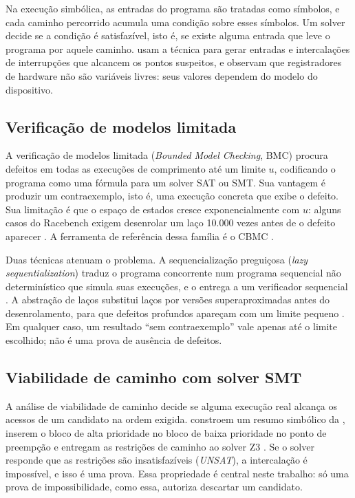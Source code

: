 Na execução simbólica, as entradas do programa são tratadas como símbolos, e
cada caminho percorrido acumula uma condição sobre esses símbolos. Um solver
decide se a condição é satisfazível, isto é, se existe alguma entrada que leve
o programa por aquele caminho.  usam a técnica para gerar
entradas e intercalações de interrupções que alcancem os pontos suspeitos, e
observam que registradores de hardware não são variáveis livres: seus valores
dependem do modelo do dispositivo.

\subsection{Verificação de modelos limitada}

A verificação de modelos limitada (\textit{Bounded Model Checking}, BMC)
procura defeitos em todas as execuções de comprimento até um limite $u$,
codificando o programa como uma fórmula para um solver SAT ou SMT. Sua
vantagem é produzir um contraexemplo, isto é, uma execução concreta que
exibe o defeito. Sua limitação é que o espaço de estados cresce
exponencialmente com $u$: alguns casos do Racebench exigem desenrolar um laço
10.000 vezes antes de o defeito aparecer \cite{nichecker}. A ferramenta de
referência dessa família é o CBMC \cite{cbmc}.

Duas técnicas atenuam o problema. A sequencialização preguiçosa
(\textit{lazy sequentialization}) traduz o programa concorrente num programa
sequencial não determinístico que simula suas execuções, e o entrega a um
verificador sequencial \cite{lazycseq}. A abstração de laços substitui
laços por versões superaproximadas antes do desenrolamento, para que defeitos
profundos apareçam com um limite pequeno \cite{nichecker}. Em qualquer caso,
um resultado ``sem contraexemplo'' vale apenas até o limite escolhido; não é
uma prova de ausência de defeitos.

\subsection{Viabilidade de caminho com solver SMT}

A análise de viabilidade de caminho decide se alguma execução real alcança os
acessos de um candidato na ordem exigida.  constroem um
resumo simbólico da \isr, inserem o bloco de alta prioridade no bloco de baixa
prioridade no ponto de preempção e entregam as restrições de caminho ao solver
Z3 \cite{z3}. Se o solver responde que as restrições são insatisfazíveis
(\textit{UNSAT}), a intercalação é impossível, e isso é uma prova.
Essa propriedade é central neste trabalho: só uma prova de impossibilidade, como essa, autoriza descartar um candidato.

